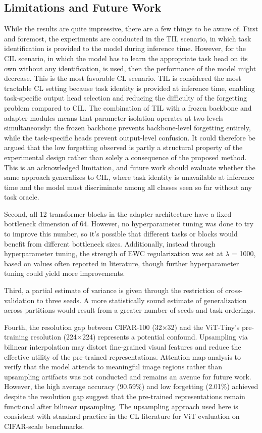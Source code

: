 \documentclass[english, LaM, oneside]{sapthesis}%
\numberwithin{equation}{chapter}
\begin{document}
\subsection{Limitations and Future Work}
While the results are quite impressive, there are a few things to be aware of. First and foremost, the experiments are conducted in the TIL scenario, in which task identification is provided to the model during inference time. However, for the CIL scenario, in which the model has to learn the appropriate task head on its own without any identification, is used, then the performance of the model might decrease. This is the most favorable CL scenario. TIL is considered the most tractable CL setting because task identity is provided at inference time, enabling task-specific output head selection and reducing the difficulty of the forgetting problem compared to CIL. The combination of TIL with a frozen backbone and adapter modules means that parameter isolation operates at two levels simultaneously: the frozen backbone prevents backbone-level forgetting entirely, while the task-specific heads prevent output-level confusion. It could therefore be argued that the low forgetting observed is partly a structural property of the experimental design rather than solely a consequence of the proposed method. This is an acknowledged limitation, and future work should evaluate whether the same approach generalizes to CIL, where task identity is unavailable at inference time and the model must discriminate among all classes seen so far without any task oracle.

Second, all 12 transformer blocks in the adapter architecture have a fixed bottleneck dimension of 64. However, no hyperparameter tuning was done to try to improve this number, so it's possible that different tasks or blocks would benefit from different bottleneck sizes. Additionally, instead through hyperparameter tuning, the strength of EWC regularization was set at $\lambda$ = 1000, based on values often reported in literature, though further hyperparameter tuning could yield more improvements.

Third, a partial estimate of variance is given through the restriction of cross-validation to three seeds. A more statistically sound estimate of generalization across partitions would result from a greater number of seeds and task orderings.

Fourth, the resolution gap between CIFAR-100 (32×32) and the ViT-Tiny's pre-training resolution (224×224) represents a potential confound. Upsampling via bilinear interpolation may distort fine-grained visual features and reduce the effective utility of the pre-trained representations. Attention map analysis to verify that the model attends to meaningful image regions rather than upsampling artifacts was not conducted and remains an avenue for future work. However, the high average accuracy (90.59\%) and low forgetting (2.01\%) achieved despite the resolution gap suggest that the pre-trained representations remain functional after bilinear upsampling. The upsampling approach used here is consistent with standard practice in the CL literature \cite{5}\cite{41} for ViT evaluation on CIFAR-scale benchmarks.
\end{document}

